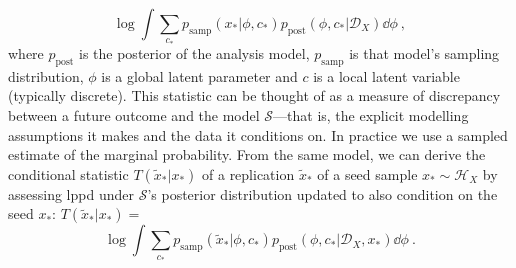 \begin{equation}\label{eq:lppd}
    \log \int  \sum_{c_*} p_{\text{samp}}(x_*|\phi, c_*)p_{\text{post}}(\phi, c_*|\mathcal D_X) \dd\phi ~,
\end{equation}
where $p_{\text{post}}$ is the posterior of the analysis model, $p_{\text{samp}}$ is that model's sampling distribution, $\phi$ is a global latent parameter and $c$ is a local latent variable (typically discrete). 
This statistic can be thought of as a measure of discrepancy between a future outcome and the model $\mathcal S$---that is, the explicit modelling assumptions it makes and the data it conditions on. %
In practice we use a sampled estimate of the marginal probability.
From the same model, we can derive the conditional statistic $T(\tilde x_*|x_*)$ of a replication $\tilde x_*$ of a seed sample $x_* \sim \mathcal H_X$ by assessing lppd under $\mathcal S$'s posterior distribution updated to also condition on the seed $x_*$: $T(\tilde x_*|x_*) = $
\begin{equation}\label{eq:rlppd}
    \log \int  \sum_{c_*} p_{\text{samp}}(\tilde x_*|\phi, c_*)p_{\text{post}}(\phi, c_*|\mathcal D_X, x_*) \dd\phi ~.
\end{equation}


%


